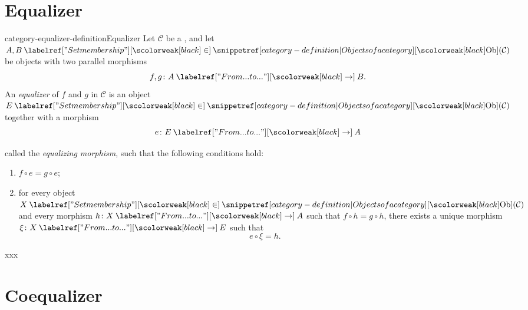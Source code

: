 \documentclass[preview]{standalone}
\begin{document}
\genpage

\section{Equalizer}

\begin{snippetdefinition}{category-equalizer-definition}{Equalizer}
    Let \(\mathcal{C}\) be a \category, and let \(A,B \in \catob(\mathcal{C})\) be objects
    with two parallel morphisms
    \[
        f,g \colon A \fromto B.
    \]
    An \emph{equalizer} of \(f\) and \(g\) in \(\mathcal{C}\) is an object
    \(E \in \catob(\mathcal{C})\) together with a morphism
    \[
        e \colon E \fromto A
    \]
    \begin{minipage}{0.65\textwidth}
        called the \emph{equalizing morphism}, such that the following conditions hold:
        \begin{enumerate}
            \item \(f \circ e = g \circ e\);
            \item for every object \(X \in \catob(\mathcal{C})\) and every morphism
            \(h \colon X \fromto A\) such that \(f \circ h = g \circ h\),
            there exists a unique morphism \(\xi \colon X \fromto E\) such that
            \[
                e \circ \xi = h.
            \]
        \end{enumerate}
    \end{minipage}
    \begin{minipage}{0.35\textwidth}
        \begin{center}
        xxx
        \end{center}
    \end{minipage}
\end{snippetdefinition}

\section{Coequalizer}
\end{document}
